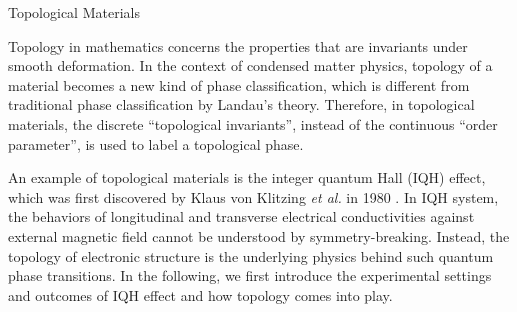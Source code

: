 	{\centering
		\vspace{12pt} Topological Materials
	    \par
	}
Topology in mathematics concerns the properties that are invariants under smooth deformation. In the context of condensed matter physics, topology of a material becomes a new kind of phase classification, which is different from traditional phase classification by Landau's theory. Therefore, in topological materials, the discrete ``topological invariants'', instead of the continuous ``order parameter'', is used to label a topological phase. 

An example of topological materials is the integer quantum Hall (IQH) effect, which was first discovered by Klaus von Klitzing {\it et al.} in 1980 \cite{Klitzing1980new}. In IQH system, the behaviors of longitudinal and transverse electrical conductivities against external magnetic field cannot be understood by symmetry-breaking. Instead, the topology of electronic structure is the underlying physics behind such quantum phase transitions. In the following, we first introduce the experimental settings and outcomes of IQH effect and how topology comes into play.

